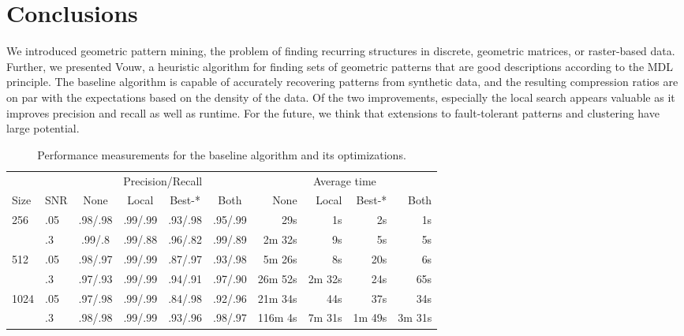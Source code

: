 \documentclass{llncs}
\begin{document}
\section{Conclusions}

We introduced geometric pattern mining, the problem of finding recurring structures in discrete, geometric matrices, or raster-based data. %
Further, we presented Vouw, a heuristic algorithm for finding sets of geometric patterns that are good descriptions according to the MDL principle. The baseline algorithm is capable of accurately recovering patterns from synthetic data, and the resulting compression ratios are on par with the expectations based on the density of the data. Of the two improvements, especially the local search appears valuable as it improves precision and recall as well as runtime. For the future, we think that extensions to fault-tolerant patterns and clustering have large potential.

\begin{table}[t]
\caption{Performance measurements for the baseline algorithm and its optimizations.}
\label{table:optimize}
\begin{tabular*}{\textwidth}{l @{\extracolsep{\fill}}lccccrrrr}
\toprule
 & & \multicolumn{4}{c}{Precision/Recall} & \multicolumn{4}{c}{Average time}\\
 \cmidrule(l){3-6} \cmidrule(l){7-10} 
 Size & SNR & None & Local & Best-* & Both & None & Local & Best-* & Both \\
\midrule
 256 & .05 & .98/.98 & .99/.99 & .93/.98 & .95/.99 & 29s & 1s & 2s & 1s \\
   & .3 &.99/.8 & .99/.88 & .96/.82 & .99/.89 & 2m 32s & 9s & 5s & 5s \\
 512 & .05 & .98/.97 & .99/.99 & .87/.97 & .93/.98 & 5m 26s & 8s & 20s & 6s \\
  & .3 &.97/.93 & .99/.99 & .94/.91 & .97/.90 & 26m 52s & 2m 32s & 24s & 65s \\
 1024 & .05 & .97/.98 & .99/.99 & .84/.98 & .92/.96 & 21m 34s & 44s & 37s & 34s \\
 & .3 &.98/.98 & .99/.99 & .93/.96 & .98/.97 & 116m 4s & 7m 31s & 1m 49s & 3m 31s \\
\bottomrule
\end{tabular*}
\end{table}
\end{document}
